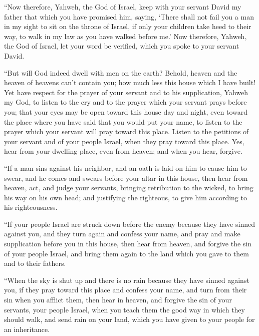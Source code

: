  ``Now therefore, Yahweh, the God of Israel, keep with
your servant David my father that which you have promised him, saying,
`There shall not fail you a man in my sight to sit on the throne of
Israel, if only your children take heed to their way, to walk in my law
as you have walked before me.'  Now therefore, Yahweh,
the God of Israel, let your word be verified, which you spoke to your
servant David.

 ``But will God indeed dwell with men on the earth?
Behold, heaven and the heaven of heavens can't contain you; how much
less this house which I have built!  Yet have respect for
the prayer of your servant and to his supplication, Yahweh my God, to
listen to the cry and to the prayer which your servant prays before you;
 that your eyes may be open toward this house day and
night, even toward the place where you have said that you would put your
name, to listen to the prayer which your servant will pray toward this
place.  Listen to the petitions of your servant and of
your people Israel, when they pray toward this place. Yes, hear from
your dwelling place, even from heaven; and when you hear, forgive.

 ``If a man sins against his neighbor, and an oath is
laid on him to cause him to swear, and he comes and swears before your
altar in this house,  then hear from heaven, act, and
judge your servants, bringing retribution to the wicked, to bring his
way on his own head; and justifying the righteous, to give him according
to his righteousness.

 ``If your people Israel are struck down before the enemy
because they have sinned against you, and they turn again and confess
your name, and pray and make supplication before you in this house,
 then hear from heaven, and forgive the sin of your
people Israel, and bring them again to the land which you gave to them
and to their fathers.

 ``When the sky is shut up and there is no rain because
they have sinned against you, if they pray toward this place and confess
your name, and turn from their sin when you afflict them,
 then hear in heaven, and forgive the sin of your
servants, your people Israel, when you teach them the good way in which
they should walk, and send rain on your land, which you have given to
your people for an inheritance.

